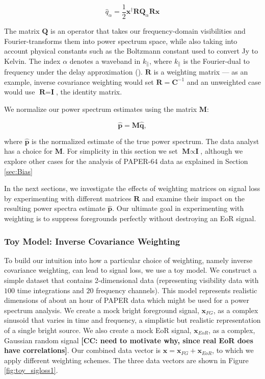 \documentclass[preprint2,numberedappendix,tighten]{aastex6}  %
\newcommand{\cc}[1]{{\color{purple} \textbf{[CC: #1]}}}
\begin{document}
\begin{equation}
\label{eq:qhat}
\hat{q}_{\alpha} = \frac{1}{2}\textbf{x}^{\dagger}\textbf{R}\textbf{Q}_{\alpha}\textbf{R}\textbf{x}
\end{equation}

\noindent The matrix $\textbf{Q}$ is an operator that takes our frequency-domain visibilities and Fourier-transforms them into power spectrum space, while also taking into account physical constants such as the Boltzmann constant used to convert Jy to Kelvin. The index $\alpha$ denotes a waveband in $k_{\parallel}$, where $k_{\parallel}$ is the Fourier-dual to frequency under the delay approximation (\citealt{parsons_et_al2012b}). $\textbf{R}$ is a weighting matrix --- as an example, inverse covariance weighting would set $\textbf{R} = \textbf{C}^{-1}$ and an unweighted case would use $\textbf{R} = \textbf{I}$, the identity matrix.

We normalize our power spectrum estimates using the matrix $\textbf{M}$:

\begin{equation}
\label{eq:phat}
\hat{\textbf{p}} = \textbf{M}\hat{\textbf{q}},
\end{equation}

\noindent where $\hat{\textbf{p}}$ is the normalized estimate of the true power spectrum. The data analyst has a choice for $\textbf{M}$. For simplicity in this section we set $\textbf{M} \propto \textbf{I}$, although we explore other cases for the analysis of PAPER-64 data as explained in Section \ref{sec:Bias}

In the next sections, we investigate the effects of weighting matrices on signal loss by experimenting with different matrices $\textbf{R}$ and examine their impact on the resulting power spectra estimate $\hat{\textbf{p}}$. Our ultimate goal in experimenting with weighting is to suppress foregrounds perfectly without destroying an EoR signal.

\subsubsection{Toy Model: Inverse Covariance Weighting}
\label{sec:toymodel}

To build our intuition into how a particular choice of weighting, namely inverse covariance weighting, can lead to signal loss, we use a toy model. We construct a simple dataset that contains 2-dimensional data (representing visibility data with $100$ time integrations and $20$ frequency channels). This model represents realistic dimensions of about an hour of PAPER data which might be used for a power spectrum analysis. We create a mock bright foreground signal, $\textbf{x}_{FG}$, as a complex sinusoid that varies in time and frequency, a simplistic but realistic representation of a single bright source. We also create a mock EoR signal, $\textbf{x}_{EoR}$, as a complex, Gaussian random signal \cc{need to motivate why, since real EoR does have correlations}. Our combined data vector is $\textbf{x} = \textbf{x}_{FG} + \textbf{x}_{EoR}$, to which we apply different weighting schemes. The three data vectors are shown in Figure \ref{fig:toy_sigloss1}. 
\end{document}
